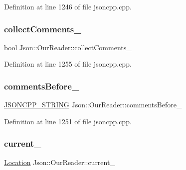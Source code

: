 Definition at line 1246 of file jsoncpp.\+cpp.

\hypertarget{class_json_1_1_our_reader_a259f6ac988da2894bcafc670e42f73ad}{}\label{class_json_1_1_our_reader_a259f6ac988da2894bcafc670e42f73ad} 
\subsubsection{\texorpdfstring{collect\+Comments\+\_\+}{collectComments\_}}
{\footnotesize\ttfamily bool Json\+::\+Our\+Reader\+::collect\+Comments\+\_\+\hspace{0.3cm}{\ttfamily [private]}}



Definition at line 1255 of file jsoncpp.\+cpp.

\hypertarget{class_json_1_1_our_reader_a9c53e77e290eb9081298210a955fda6a}{}\label{class_json_1_1_our_reader_a9c53e77e290eb9081298210a955fda6a} 
\subsubsection{\texorpdfstring{comments\+Before\+\_\+}{commentsBefore\_}}
{\footnotesize\ttfamily \hyperlink{config_8h_a1e723f95759de062585bc4a8fd3fa4be}{J\+S\+O\+N\+C\+P\+P\+\_\+\+S\+T\+R\+I\+NG} Json\+::\+Our\+Reader\+::comments\+Before\+\_\+\hspace{0.3cm}{\ttfamily [private]}}



Definition at line 1251 of file jsoncpp.\+cpp.

\hypertarget{class_json_1_1_our_reader_a5211fbbba94be80a22dd2317c621efcc}{}\label{class_json_1_1_our_reader_a5211fbbba94be80a22dd2317c621efcc} 
\subsubsection{\texorpdfstring{current\+\_\+}{current\_}}
{\footnotesize\ttfamily \hyperlink{class_json_1_1_our_reader_a1bdc7bbc52ba87cae6b19746f2ee0189}{Location} Json\+::\+Our\+Reader\+::current\+\_\+\hspace{0.3cm}{\ttfamily [private]}}



